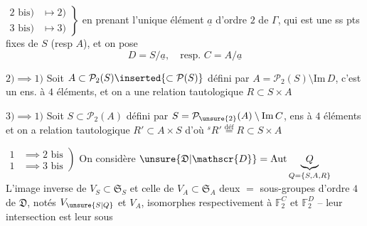 $\left.\begin{aligned}2\text{ bis})&\longmapsto2)\\3\text{ bis})&\longmapsto3)\end{aligned}\right\}$
en prenant l'unique élément $\underline a$ d'ordre $2$ de $\Gamma$, qui est une  ss pts fixes de $S$ (resp $A$), et on pose
\[
D=S/\underline a,\quad\text{resp. }C=A/\underline a
\]

$2)$$\implies1)$ \quad Soit $A\subset\mathcal{P}_2(S)\inserted{\subset\mathcal{P}(S)}$ défini par $A=\mathcal{P}_2(S)\setminus\mathrm{Im}\,D$, c'est un ens. à $4$ éléments,  et on a une relation tautologique $R\subset S\times A$

$3)\implies1)$ \quad Soit $S\subset\mathcal{P}_2(A)$ défini par $S=\mathcal{P}_{\unsure{2}}(A)\setminus\mathrm{Im}\,C$, ens à $4$ éléments et on a relation tautologique $R'\subset A\times S$ d'où $ {}^{s}R'\stackrel{\mathrm{déf}}{=}R\subset S\times A$

$\left.\begin{aligned}1&\implies2\text{ bis}\\1&\implies3\text{ bis}\end{aligned}\right)$
On considère $\unsure{\mathfrak{D}|\mathscr{D}}=\mathrm{Aut}\underbrace{Q}_{Q=\{S,A,R\}}$
   
L'image inverse de $V_S\subset\mathfrak{S}_S$ et celle de $V_A\subset\mathfrak{S}_A$  deux $=$ sous-groupes d'ordre $4$  de $\mathfrak{D}$, notés $V_{\unsure{S|Q}}$ et $V_A$, isomorphes respectivement à $\mathbb{F}_2^C$ et $\mathbb{F}_2^D$ -- leur intersection est leur sous


